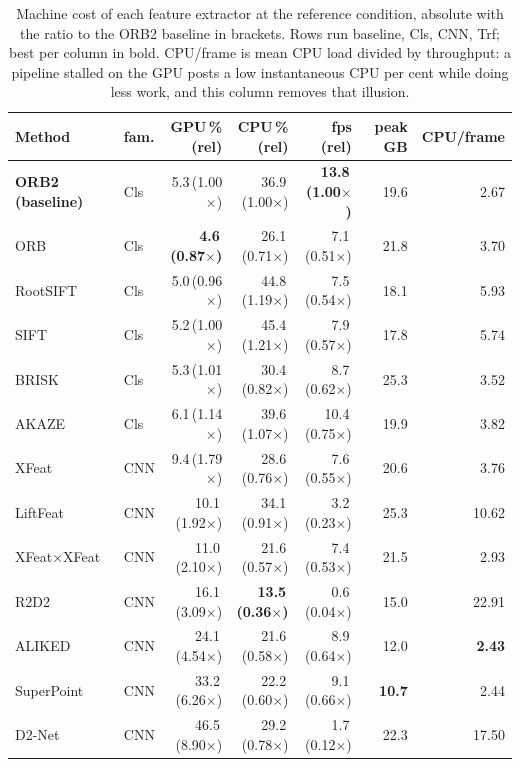 \begin{table}[H]
\centering
\caption{Machine cost of each feature extractor at the reference condition, absolute with the ratio to the ORB2 baseline in brackets. Rows run baseline, Cls, CNN, Trf; best per column in bold. CPU/frame is mean CPU load divided by throughput: a pipeline stalled on the GPU posts a low instantaneous CPU per cent while doing less work, and this column removes that illusion.}
\label{tab:hw-cost-fe}
\footnotesize
\setlength{\tabcolsep}{4pt}
\begin{tabular}{@{}llrrrrr@{}}
\toprule
\textbf{Method} & \textbf{fam.} & \textbf{GPU\,\% (rel)} & \textbf{CPU\,\% (rel)} & \textbf{fps (rel)} & \textbf{peak GB} & \textbf{CPU/frame} \\
\midrule
\textbf{ORB2 (baseline)} & Cls & 5.3\,(1.00$\times$) & 36.9\,(1.00$\times$) & \textbf{13.8\,(1.00$\times$)} & 19.6 & 2.67 \\
ORB & Cls & \textbf{4.6\,(0.87$\times$)} & 26.1\,(0.71$\times$) & 7.1\,(0.51$\times$) & 21.8 & 3.70 \\
RootSIFT & Cls & 5.0\,(0.96$\times$) & 44.8\,(1.19$\times$) & 7.5\,(0.54$\times$) & 18.1 & 5.93 \\
SIFT & Cls & 5.2\,(1.00$\times$) & 45.4\,(1.21$\times$) & 7.9\,(0.57$\times$) & 17.8 & 5.74 \\
BRISK & Cls & 5.3\,(1.01$\times$) & 30.4\,(0.82$\times$) & 8.7\,(0.62$\times$) & 25.3 & 3.52 \\
AKAZE & Cls & 6.1\,(1.14$\times$) & 39.6\,(1.07$\times$) & 10.4\,(0.75$\times$) & 19.9 & 3.82 \\
XFeat & CNN & 9.4\,(1.79$\times$) & 28.6\,(0.76$\times$) & 7.6\,(0.55$\times$) & 20.6 & 3.76 \\
LiftFeat & CNN & 10.1\,(1.92$\times$) & 34.1\,(0.91$\times$) & 3.2\,(0.23$\times$) & 25.3 & 10.62 \\
XFeat×XFeat & CNN & 11.0\,(2.10$\times$) & 21.6\,(0.57$\times$) & 7.4\,(0.53$\times$) & 21.5 & 2.93 \\
R2D2 & CNN & 16.1\,(3.09$\times$) & \textbf{13.5\,(0.36$\times$)} & 0.6\,(0.04$\times$) & 15.0 & 22.91 \\
ALIKED & CNN & 24.1\,(4.54$\times$) & 21.6\,(0.58$\times$) & 8.9\,(0.64$\times$) & 12.0 & \textbf{2.43} \\
SuperPoint & CNN & 33.2\,(6.26$\times$) & 22.2\,(0.60$\times$) & 9.1\,(0.66$\times$) & \textbf{10.7} & 2.44 \\
D2-Net & CNN & 46.5\,(8.90$\times$) & 29.2\,(0.78$\times$) & 1.7\,(0.12$\times$) & 22.3 & 17.50 \\

\end{tabular}
\end{table}
